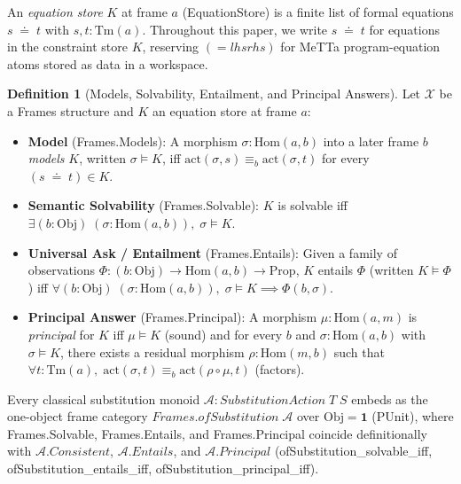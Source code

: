 \documentclass[11pt,a4paper]{article}
\theoremstyle{definition}
\newtheorem{definition}[theorem]{Definition}
\DeclareRobustCommand{\lean}[1]{%
  \ifmmode\text{\normalfont\ttfamily\footnotesize\detokenize{#1}}%
  \else{\normalfont\footnotesize\leanurl{#1}}\fi}
\DeclareRobustCommand{\metta}[1]{\text{\normalfont\ttfamily\footnotesize #1}}
\def\lean#1{#1}%
\def\metta#1{#1}%
\newcommand{\doteqStore}{\;\doteq\;}
\begin{document}
An \emph{equation store} $K$ at frame $a$ (\lean{EquationStore}) is a finite list of formal equations $s \doteqStore t$ with $s, t : \mathrm{Tm}(a)$. Throughout this paper, we write $s \doteqStore t$ for equations in the constraint store $K$, reserving $\metta{(= lhs rhs)}$ for MeTTa program-equation atoms stored as data in a workspace.

\begin{definition}[Models, Solvability, Entailment, and Principal Answers]
Let $\mathcal{X}$ be a \lean{Frames} structure and $K$ an equation store at frame $a$:
\begin{itemize}[leftmargin=1.8em, nosep]
  \item \textbf{Model} (\lean{Frames.Models}): A morphism $\sigma : \mathrm{Hom}(a, b)$ into a later frame $b$ \emph{models} $K$, written $\sigma \models K$, iff $\mathrm{act}(\sigma, s) \equiv_b \mathrm{act}(\sigma, t)$ for every $(s \doteqStore t) \in K$.
  \item \textbf{Semantic Solvability} (\lean{Frames.Solvable}): $K$ is solvable iff $\exists (b : \mathrm{Obj})\;(\sigma : \mathrm{Hom}(a, b)),\; \sigma \models K$.
  \item \textbf{Universal Ask / Entailment} (\lean{Frames.Entails}): Given a family of observations $\Phi : (b : \mathrm{Obj}) \to \mathrm{Hom}(a, b) \to \mathrm{Prop}$, $K$ entails $\Phi$ (written $K \models \Phi$) iff $\forall (b : \mathrm{Obj})\;(\sigma : \mathrm{Hom}(a, b)),\; \sigma \models K \implies \Phi(b, \sigma)$.
  \item \textbf{Principal Answer} (\lean{Frames.Principal}): A morphism $\mu : \mathrm{Hom}(a, m)$ is \emph{principal} for $K$ iff $\mu \models K$ (\lean{sound}) and for every $b$ and $\sigma : \mathrm{Hom}(a, b)$ with $\sigma \models K$, there exists a residual morphism $\rho : \mathrm{Hom}(m, b)$ such that $\forall t : \mathrm{Tm}(a),\; \mathrm{act}(\sigma, t) \equiv_b \mathrm{act}(\rho \circ \mu, t)$ (\lean{factors}).
\end{itemize}
\end{definition}

Every classical substitution monoid $\mathcal{A} : \lean{SubstitutionAction}\;T\;S$ embeds as the one-object frame category $\lean{Frames.ofSubstitution}\;\mathcal{A}$ over $\mathrm{Obj} = \mathbf{1}$ (\lean{PUnit}), where \lean{Frames.Solvable}, \lean{Frames.Entails}, and \lean{Frames.Principal} coincide definitionally with $\mathcal{A}.\lean{Consistent}$, $\mathcal{A}.\lean{Entails}$, and $\mathcal{A}.\lean{Principal}$ (\lean{ofSubstitution_solvable_iff}, \lean{ofSubstitution_entails_iff}, \lean{ofSubstitution_principal_iff}).
\end{document}
